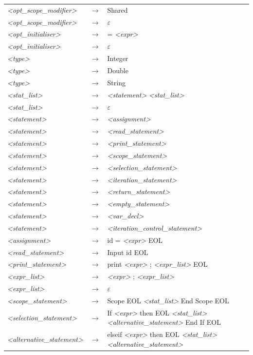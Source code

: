 \documentclass[a4paper, 11pt]{article}
\begin{document}
\begin{table}[H]
\begin{tabular}[l]{l l p{10cm}}
\textit{<opt\_scope\_modifier>} & $\rightarrow$ & Shared \\
\textit{<opt\_scope\_modifier>} & $\rightarrow$ & $\varepsilon$ \\
\textit{<opt\_initialiser>} & $\rightarrow$ & = \textit{<expr>} \\
\textit{<opt\_initialiser>} & $\rightarrow$ & $\varepsilon$ \\
\textit{<type>} & $\rightarrow$ & Integer \\
\textit{<type>} & $\rightarrow$ & Double \\
\textit{<type>} & $\rightarrow$ & String \\
\textit{<stat\_list>} & $\rightarrow$ & \textit{<statement>} \textit{<stat\_list>} \\
\textit{<stat\_list>} & $\rightarrow$ & $\varepsilon$ \\
\textit{<statement>} & $\rightarrow$ & \textit{<assignment>} \\
\textit{<statement>} & $\rightarrow$ & \textit{<read\_statement>} \\
\textit{<statement>} & $\rightarrow$ & \textit{<print\_statement>} \\
\textit{<statement>} & $\rightarrow$ & \textit{<scope\_statement>} \\
\textit{<statement>} & $\rightarrow$ & \textit{<selection\_statement>} \\
\textit{<statement>} & $\rightarrow$ & \textit{<iteration\_statement>} \\
\textit{<statement>} & $\rightarrow$ & \textit{<return\_statement>} \\
\textit{<statement>} & $\rightarrow$ & \textit{<empty\_statement>} \\
\textit{<statement>} & $\rightarrow$ & \textit{<var\_decl>} \\
\textit{<statement>} & $\rightarrow$ & \textit{<iteration\_control\_statement>} \\
\textit{<assignment>} & $\rightarrow$ & id = \textit{<expr>} EOL \\
\textit{<read\_statement>} & $\rightarrow$ & Input id EOL \\
\textit{<print\_statement>} & $\rightarrow$ & print \textit{<expr>} ; \textit{<expr\_list>} EOL \\
\textit{<expr\_list>} & $\rightarrow$ & \textit{<expr>} ; \textit{<expr\_list>} \\
\textit{<expr\_list>} & $\rightarrow$ & $\varepsilon$ \\
\textit{<scope\_statement>} & $\rightarrow$ & Scope EOL \textit{<stat\_list>} End Scope EOL \\
\textit{<selection\_statement>} & $\rightarrow$ & If \textit{<expr>} then EOL \textit{<stat\_list>} \textit{<alternative\_statement>} End If EOL \\
\textit{<alternative\_statement>} & $\rightarrow$ & elseif \textit{<expr>} then EOL \textit{<stat\_list>}  \textit{<alternative\_statement>} \\
\end{tabular}
\end{table}
\end{document}
